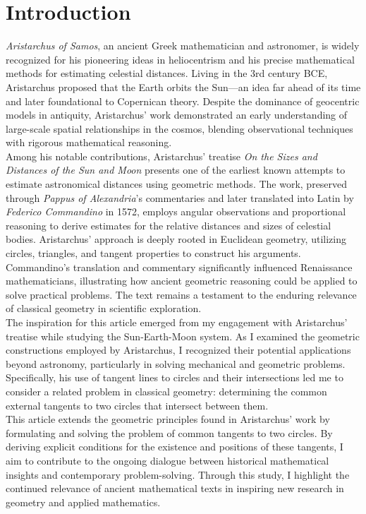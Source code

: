 \section*{Introduction}
\textit{Aristarchus of Samos}, an ancient Greek mathematician and astronomer, is widely recognized for his pioneering ideas in heliocentrism and his precise mathematical methods for estimating celestial distances. Living in the 3rd century BCE, Aristarchus proposed that the Earth orbits the Sun—an idea far ahead of its time and later foundational to Copernican theory. Despite the dominance of geocentric models in antiquity, Aristarchus’ work demonstrated an early understanding of large-scale spatial relationships in the cosmos, blending observational techniques with rigorous mathematical reasoning.\\

Among his notable contributions, Aristarchus’ treatise \textit{On the Sizes and Distances of the Sun and Moon}\cite{Aristarchus1572} presents one of the earliest known attempts to estimate astronomical distances using geometric methods. The work, preserved through \textit{Pappus of Alexandria}’s commentaries and later translated into Latin by \textit{Federico Commandino} in 1572, employs angular observations and proportional reasoning to derive estimates for the relative distances and sizes of celestial bodies. Aristarchus’ approach is deeply rooted in Euclidean geometry, utilizing circles, triangles, and tangent properties to construct his arguments.\\

Commandino’s translation and commentary significantly influenced Renaissance mathematicians, illustrating how ancient geometric reasoning could be applied to solve practical problems. The text remains a testament to the enduring relevance of classical geometry in scientific exploration.\\

The inspiration for this article emerged from my engagement with Aristarchus’ treatise while studying the Sun-Earth-Moon system. As I examined the geometric constructions employed by Aristarchus, I recognized their potential applications beyond astronomy, particularly in solving mechanical and geometric problems. Specifically, his use of tangent lines to circles and their intersections led me to consider a related problem in classical geometry: determining the common external tangents to two circles that intersect between them.\\

This article extends the geometric principles found in Aristarchus’ work by formulating and solving the problem of common tangents to two circles. By deriving explicit conditions for the existence and positions of these tangents, I aim to contribute to the ongoing dialogue between historical mathematical insights and contemporary problem-solving. Through this study, I highlight the continued relevance of ancient mathematical texts in inspiring new research in geometry and applied mathematics.
